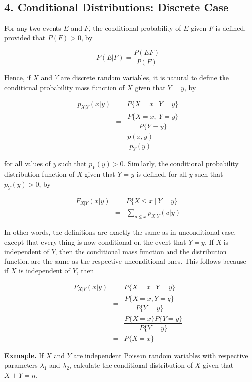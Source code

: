 \subsection*{4. Conditional Distributions: Discrete Case}

For any two events $E$ and $F$, the conditional probability of $E$ given $F$ is defined, provided that $P(F) > 0$, by

$$P(E|F) = \dfrac{P(EF)}{P(F)}$$

Hence, if $X$ and $Y$ are discrete random variables, it is natural to define the conditional probability mass function of $X$ given that $Y = y$, by

\begin{eqnarray*}
	p_{X|Y}(x|y) &=& P\{X = x~|~ Y = y\}\\
	&=& \dfrac{P\{X = x,~Y = y\}}{P \{Y = y\}}\\
	&=& \dfrac{p(x,y)}{p_Y(y)}
\end{eqnarray*}

for all values of $y$ such that $p_Y(y) > 0$. Similarly, the conditional probability distribution function of $X$ given that $Y = y$ is defined, for all $y$ such that $p_Y(y) > 0$, by

\begin{eqnarray*}
	F_{X|Y}(x|y) &=& P\{X \leq x ~|~ Y = y\}\\
	&=& \sum_{a \leq x}p_{X|Y}(a|y)
\end{eqnarray*}

In other words, the definitions are exactly the same as in unconditional case, except that every thing is now conditional on the event that $Y = y$. If $X$ is independent of $Y$, then the conditional mass function and the distribution function are the same as the respective unconditional ones. This follows because if $X$ is independent of $Y$, then 

\begin{eqnarray*}
	P_{X|Y}(x|y) &=& P\{X = x~|~Y = y\}\\
	&=& \dfrac{P\{X = x, Y = y\}}{P \{Y = y\}}\\
	&=& \dfrac{P\{X = x\}P\{Y = y\}}{P\{Y = y\}}\\
	&=& P\{X = x\}
\end{eqnarray*}

\textbf{Exmaple.} If $X$ and $Y$ are independent Poisson random variables with respective parameters $\lambda_1$ and $\lambda_2$, calculate the conditional distribution of $X$ given that $X + Y = n$.

